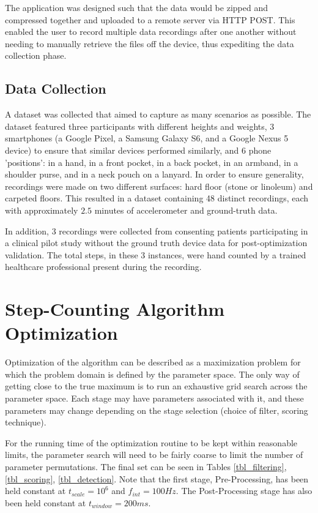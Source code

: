            The application was designed such that the data would be zipped and compressed together and uploaded to a remote server via HTTP POST. This enabled the user to record multiple data recordings after one another without needing to manually retrieve the files off the device, thus expediting the data collection phase.


        \section{Data Collection}

            A dataset was collected that aimed to capture as many scenarios as possible. The dataset featured three participants with different heights and weights, 3 smartphones (a Google Pixel, a Samsung Galaxy S6, and a Google Nexus 5 device) to ensure that similar devices performed similarly, and 6 phone 'positions': in a hand, in a front pocket, in a back pocket, in an armband, in a shoulder purse, and in a neck pouch on a lanyard. In order to ensure generality, recordings were made on two different surfaces: hard floor (stone or linoleum) and carpeted floors. This resulted in a dataset containing 48 distinct recordings, each with approximately $2.5$ minutes of accelerometer and ground-truth data. 

            In addition, 3 recordings were collected from consenting patients participating in a clinical pilot study without the ground truth device data for post-optimization validation. The total steps, in these 3 instances, were hand counted by a trained healthcare professional present during the recording.

    \chapter{Step-Counting Algorithm Optimization}

         Optimization of the algorithm can be described as a maximization problem for which the problem domain is defined by the parameter space. The only way of getting close to the true maximum is to run an exhaustive grid search across the parameter space. Each stage may have parameters associated with it, and these parameters may change depending on the stage selection (choice of filter, scoring technique). 

        For the running time of the optimization routine to be kept within reasonable limits, the parameter search will need to be fairly coarse to limit the number of parameter permutations. The final set can be seen in Tables \ref{tbl_filtering}, \ref{tbl_scoring}, \ref{tbl_detection}. Note that the first stage, Pre-Processing, has been held constant at $t_{scale}=10^6$ and $f_{int}=100Hz$. The Post-Processing stage has also been held constant at $t_{window}=200ms$. 


